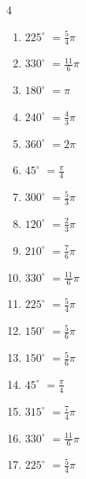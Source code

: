 \begin{multicols}{4}
\begin{enumerate}
  \item $\displaystyle 225^{\circ}$
        $\displaystyle =\frac{5}{4}\pi$

  \item $\displaystyle 330^{\circ}$
        $\displaystyle =\frac{11}{6}\pi$

  \item $\displaystyle 180^{\circ}$
        $\displaystyle =\pi$

  \item $\displaystyle 240^{\circ}$
        $\displaystyle =\frac{4}{3}\pi$

  \item $\displaystyle 360^{\circ}$
        $\displaystyle =2\pi$

  \item $\displaystyle 45^{\circ}$
        $\displaystyle =\frac{\pi}{4}$

  \item $\displaystyle 300^{\circ}$
        $\displaystyle =\frac{5}{3}\pi$

  \item $\displaystyle 120^{\circ}$
        $\displaystyle =\frac{2}{3}\pi$

  \item $\displaystyle 210^{\circ}$
        $\displaystyle =\frac{7}{6}\pi$

  \item $\displaystyle 330^{\circ}$
        $\displaystyle =\frac{11}{6}\pi$

  \item $\displaystyle 225^{\circ}$
        $\displaystyle =\frac{5}{4}\pi$

  \item $\displaystyle 150^{\circ}$
        $\displaystyle =\frac{5}{6}\pi$

  \item $\displaystyle 150^{\circ}$
        $\displaystyle =\frac{5}{6}\pi$

  \item $\displaystyle 45^{\circ}$
        $\displaystyle =\frac{\pi}{4}$

  \item $\displaystyle 315^{\circ}$
        $\displaystyle =\frac{7}{4}\pi$

  \item $\displaystyle 330^{\circ}$
        $\displaystyle =\frac{11}{6}\pi$

  \item $\displaystyle 225^{\circ}$
        $\displaystyle =\frac{5}{4}\pi$


\end{enumerate}
\end{multicols}
